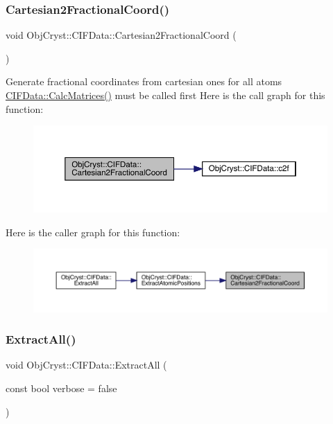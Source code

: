 \subsubsection{\texorpdfstring{Cartesian2FractionalCoord()}{Cartesian2FractionalCoord()}}
{\footnotesize\ttfamily void Obj\+Cryst\+::\+C\+I\+F\+Data\+::\+Cartesian2\+Fractional\+Coord (\begin{DoxyParamCaption}{ }\end{DoxyParamCaption})}

Generate fractional coordinates from cartesian ones for all atoms \mbox{\hyperlink{class_obj_cryst_1_1_c_i_f_data_a51e099b2881e73eb776855177aed4ca9}{C\+I\+F\+Data\+::\+Calc\+Matrices()}} must be called first Here is the call graph for this function\+:
\nopagebreak
\begin{figure}[H]
\begin{center}
\leavevmode
\includegraphics[width=350pt]{class_obj_cryst_1_1_c_i_f_data_abe437ee4b2bbda8bf7a2861f9207a8ee_cgraph}
\end{center}
\end{figure}
Here is the caller graph for this function\+:
\nopagebreak
\begin{figure}[H]
\begin{center}
\leavevmode
\includegraphics[width=350pt]{class_obj_cryst_1_1_c_i_f_data_abe437ee4b2bbda8bf7a2861f9207a8ee_icgraph}
\end{center}
\end{figure}
\mbox{\label{class_obj_cryst_1_1_c_i_f_data_a406e1448ca864b4d679edde83c6351ab}} 
\subsubsection{\texorpdfstring{ExtractAll()}{ExtractAll()}}
{\footnotesize\ttfamily void Obj\+Cryst\+::\+C\+I\+F\+Data\+::\+Extract\+All (\begin{DoxyParamCaption}\item[{const bool}]{verbose = {\ttfamily false} }\end{DoxyParamCaption})}

